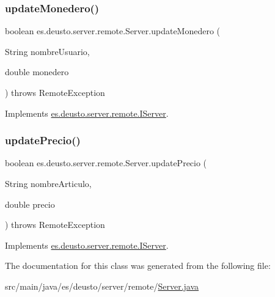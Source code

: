 \mbox{\label{classes_1_1deusto_1_1server_1_1remote_1_1_server_af6936fcce306cd9c8881f81375631a46}} 
\subsubsection{\texorpdfstring{updateMonedero()}{updateMonedero()}}
{\footnotesize\ttfamily boolean es.\+deusto.\+server.\+remote.\+Server.\+update\+Monedero (\begin{DoxyParamCaption}\item[{String}]{nombre\+Usuario,  }\item[{double}]{monedero }\end{DoxyParamCaption}) throws Remote\+Exception}



Implements \mbox{\hyperlink{interfacees_1_1deusto_1_1server_1_1remote_1_1_i_server_aaba707260bfdd38c477bea520a440119}{es.\+deusto.\+server.\+remote.\+I\+Server}}.

\mbox{\label{classes_1_1deusto_1_1server_1_1remote_1_1_server_a48e59414c1c8e7b69f7f795b61bd5311}} 
\subsubsection{\texorpdfstring{updatePrecio()}{updatePrecio()}}
{\footnotesize\ttfamily boolean es.\+deusto.\+server.\+remote.\+Server.\+update\+Precio (\begin{DoxyParamCaption}\item[{String}]{nombre\+Articulo,  }\item[{double}]{precio }\end{DoxyParamCaption}) throws Remote\+Exception}



Implements \mbox{\hyperlink{interfacees_1_1deusto_1_1server_1_1remote_1_1_i_server_a1debc07cec3cad9a483dee4dfa79af72}{es.\+deusto.\+server.\+remote.\+I\+Server}}.



The documentation for this class was generated from the following file\+:\begin{DoxyCompactItemize}
\item 
src/main/java/es/deusto/server/remote/\mbox{\hyperlink{_server_8java}{Server.\+java}}\end{DoxyCompactItemize}
